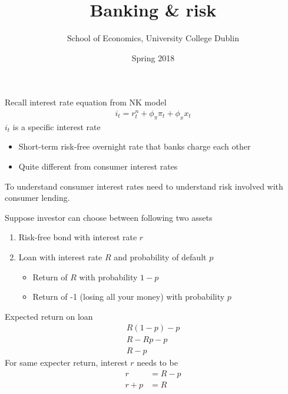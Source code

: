 \documentclass{beamer}
\title{Banking \& risk}
\author{School of Economics, University College Dublin}
\date{Spring 2018}
\begin{document}
\begin{frame}
 \titlepage
\end{frame}

\begin{frame}
 Recall interest rate equation from NK model
  \begin{align} 
  i_t=r_t^n+ \phi_{\pi}\pi_t+\phi_xx_t 
\end{align}
\medskip
$i_t$ is a specific interest rate
\begin{itemize}
  \item Short-term risk-free overnight rate that banks charge each other
  \item Quite different from consumer interest rates
\end{itemize}
\medskip
To understand consumer interest rates need to understand risk involved with consumer lending. 
\end{frame}

\begin{frame}
 Suppose investor can choose between following two assets  
\begin{enumerate}
  \item Risk-free bond with interest rate $r$
  \item Loan with interest rate $R$ and probability of default $p$
  \begin{itemize}
    \item Return of $R$ with probability $1-p$
    \item Return of -1 (losing all your money) with probability $p$
  \end{itemize}
\end{enumerate}
\end{frame}

\begin{frame}
  Expected return on loan
  \begin{align}
   R(1-p)-p\\ \nonumber
    R-Rp-p\\ \nonumber
    R-p
\end{align}
 For same expecter return, interest $r$ needs to be 
\begin{align}
  r &= R-p\\ \nonumber
  r+p &=R
\end{align}
\end{frame}
\end{document}
